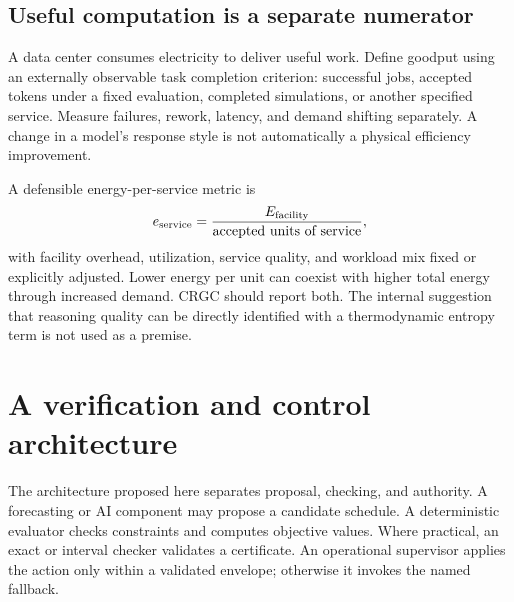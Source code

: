 \documentclass[11pt,letterpaper]{article}
\begin{document}
\subsection{Useful computation is a separate numerator}
A data center consumes electricity to deliver useful work. Define goodput using an externally observable task completion criterion: successful jobs, accepted tokens under a fixed evaluation, completed simulations, or another specified service. Measure failures, rework, latency, and demand shifting separately. A change in a model's response style is not automatically a physical efficiency improvement.

A defensible energy-per-service metric is
\[
 e_{\rm service}=\frac{E_{\rm facility}}{\text{accepted units of service}},
\]
with facility overhead, utilization, service quality, and workload mix fixed or explicitly adjusted. Lower energy per unit can coexist with higher total energy through increased demand. CRGC should report both. The internal suggestion that reasoning quality can be directly identified with a thermodynamic entropy term is not used as a premise.

\section{A verification and control architecture}
\label{sec:assurance}
The architecture proposed here separates proposal, checking, and authority. A forecasting or AI component may propose a candidate schedule. A deterministic evaluator checks constraints and computes objective values. Where practical, an exact or interval checker validates a certificate. An operational supervisor applies the action only within a validated envelope; otherwise it invokes the named fallback.

\begin{center}
\end{center}
\end{document}
